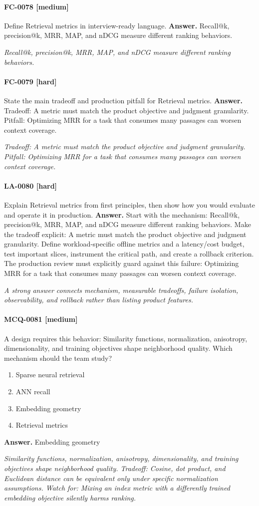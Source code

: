 \paragraph{FC-0078 [medium]} Define Retrieval metrics in interview-ready language.
\noindent\textbf{Answer.} Recall@k, precision@k, MRR, MAP, and nDCG measure different ranking behaviors.
\par\textit{Recall@k, precision@k, MRR, MAP, and nDCG measure different ranking behaviors.}
\paragraph{FC-0079 [hard]} State the main tradeoff and production pitfall for Retrieval metrics.
\noindent\textbf{Answer.} Tradeoff: A metric must match the product objective and judgment granularity. Pitfall: Optimizing MRR for a task that consumes many passages can worsen context coverage.
\par\textit{Tradeoff: A metric must match the product objective and judgment granularity. Pitfall: Optimizing MRR for a task that consumes many passages can worsen context coverage.}
\paragraph{LA-0080 [hard]} Explain Retrieval metrics from first principles, then show how you would evaluate and operate it in production.
\noindent\textbf{Answer.} Start with the mechanism: Recall@k, precision@k, MRR, MAP, and nDCG measure different ranking behaviors. Make the tradeoff explicit: A metric must match the product objective and judgment granularity. Define workload-specific offline metrics and a latency/cost budget, test important slices, instrument the critical path, and create a rollback criterion. The production review must explicitly guard against this failure: Optimizing MRR for a task that consumes many passages can worsen context coverage.
\par\textit{A strong answer connects mechanism, measurable tradeoffs, failure isolation, observability, and rollback rather than listing product features.}
\paragraph{MCQ-0081 [medium]} A design requires this behavior: Similarity functions, normalization, anisotropy, dimensionality, and training objectives shape neighborhood quality. Which mechanism should the team study?
\begin{enumerate}[label=\Alph*.]
\item Sparse neural retrieval
\item ANN recall
\item Embedding geometry
\item Retrieval metrics
\end{enumerate}
\noindent\textbf{Answer.} Embedding geometry
\par\textit{Similarity functions, normalization, anisotropy, dimensionality, and training objectives shape neighborhood quality. Tradeoff: Cosine, dot product, and Euclidean distance can be equivalent only under specific normalization assumptions. Watch for: Mixing an index metric with a differently trained embedding objective silently harms ranking.}
